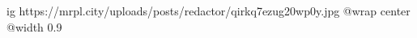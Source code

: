  
 
 
 
 

\ifcmt
  ig https://mrpl.city/uploads/posts/redactor/qirkq7ezug20wp0y.jpg
  @wrap center
  @width 0.9
\fi

